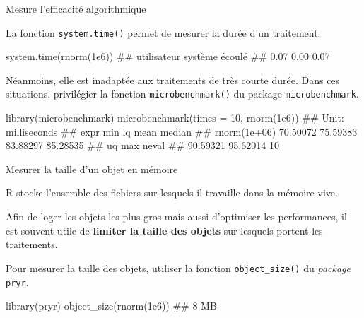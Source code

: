 \documentclass[12pt,handout,ignorenonframetext,]{beamer}
\newenvironment{Shaded}{}{}
\newcommand{\KeywordTok}[1]{\textcolor[rgb]{0.00,0.00,1.00}{#1}}
\newcommand{\DataTypeTok}[1]{#1}
\newcommand{\DecValTok}[1]{#1}
\newcommand{\FloatTok}[1]{#1}
\newcommand{\NormalTok}[1]{#1}
\renewenvironment{Shaded}{\begin{snugshade}}{\end{snugshade}}
\begin{document}
\begin{frame}[fragile]{Mesure l'efficacité algorithmique}

La fonction \texttt{system.time()} permet de mesurer la durée d'un
traitement.

\footnotesize

\begin{Shaded}
\begin{Highlighting}[]
\KeywordTok{system.time}\NormalTok{(}\KeywordTok{rnorm}\NormalTok{(}\FloatTok{1e6}\NormalTok{))}
\NormalTok{  ## utilisateur     système      écoulé }
\NormalTok{  ##        0.07        0.00        0.07}
\end{Highlighting}
\end{Shaded}

\pause \normalsize
Néanmoins, elle est inadaptée aux traitements de très courte durée. Dans
ces situations, privilégier la fonction \texttt{microbenchmark()} du
package \texttt{microbenchmark}.

\footnotesize

\begin{Shaded}
\begin{Highlighting}[]
\KeywordTok{library}\NormalTok{(microbenchmark)}
\KeywordTok{microbenchmark}\NormalTok{(}\DataTypeTok{times =} \DecValTok{10}\NormalTok{, }\KeywordTok{rnorm}\NormalTok{(}\FloatTok{1e6}\NormalTok{))}
\NormalTok{  ## Unit: milliseconds}
\NormalTok{  ##          expr      min       lq     mean   median}
\NormalTok{  ##  rnorm(1e+06) 70.50072 75.59383 83.88297 85.28535}
\NormalTok{  ##        uq      max neval}
\NormalTok{  ##  90.59321 95.62014    10}
\end{Highlighting}
\end{Shaded}

\end{frame}

\begin{frame}[fragile]{Mesurer la taille d'un objet en mémoire}

R stocke l'ensemble des fichiers sur lesquels il travaille dans la
mémoire vive.

Afin de loger les objets les plus gros mais aussi d'optimiser les
performances, il est souvent utile de \textbf{limiter la taille des
objets} sur lesquels portent les traitements.

\pause Pour mesurer la taille des objets, utiliser la fonction
\texttt{object\_size()} du \emph{package} \texttt{pryr}.

\begin{Shaded}
\begin{Highlighting}[]
\KeywordTok{library}\NormalTok{(pryr)}
\KeywordTok{object_size}\NormalTok{(}\KeywordTok{rnorm}\NormalTok{(}\FloatTok{1e6}\NormalTok{))}
\NormalTok{  ## 8 MB}
\end{Highlighting}
\end{Shaded}

\end{frame}
\end{document}
